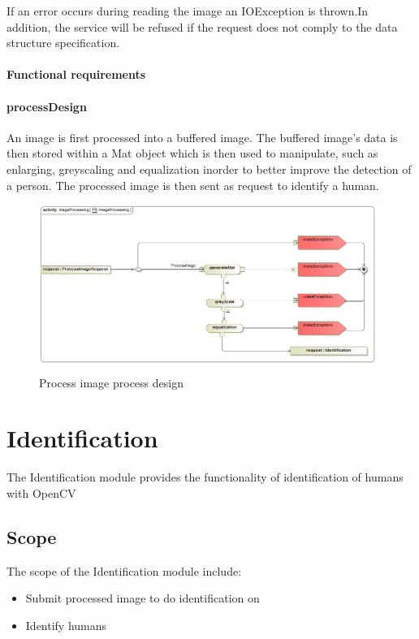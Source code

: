 \documentclass[a4paper,12pt]{report}
\begin{document}
			If an error occurs during reading the image an IOException is thrown.In addition, the service will be refused if the request does not comply to the data structure specification.
		
		\FloatBarrier
		\paragraph {Functional requirements}

		\FloatBarrier
		\paragraph {processDesign}
		An image is first processed into a buffered image. The buffered image's data is then stored within a Mat object which is then used to manipulate, such as enlarging, greyscaling and equalization inorder to better improve the detection of a person. The processed image is then sent as request to identify a human.
		\begin{figure}[htb]
			\centering
			\includegraphics [scale=0.5]{../Diagrams/ImageProcessing.jpg}
			\caption{Process image process design}
		\end{figure}	

\FloatBarrier	
\section {Identification}
The Identification module provides the functionality of identification of humans with OpenCV

	\FloatBarrier	
	\subsection {Scope}
	The scope of the Identification module include:
		\begin {itemize}
			\item Submit processed image to do identification on
			\item Identify humans
		\end {itemize}
\end{document}
